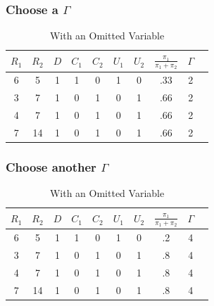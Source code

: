 \documentclass{beamer}
\begin{document}
\begin{frame}[c]\frametitle{Choose a $\Gamma$}
	\begin{table}
		\begin{center}
			\begin{tabular}{cccccccccc}
				$R_1$ & $R_2$ & $D$ & $C_1$ &$C_2$  & $U_1$ & $U_2$ & $\frac{\pi_1}{\pi_1 + \pi_2}$ & $\Gamma$\\ \hline
				6 & 5 & 1 & 1 & 0  & 1 & 0 &  .33 & 2\\
				3 & 7 & 1 & 0 & 1  & 0 & 1 & .66  & 2\\
				4 & 7 & 1 & 0 & 1  & 0 & 1 &  .66 & 2\\
				7 & 14 & 1 & 0 & 1  & 0 & 1 & .66 & 2\\
			\end{tabular}
		\end{center}
		\caption{With an Omitted Variable}
	\end{table}
\end{frame}


\begin{frame}[c]\frametitle{Choose another $\Gamma$}
	\begin{table}
		\begin{center}
			\begin{tabular}{cccccccccc}
				$R_1$ & $R_2$ & $D$ & $C_1$ &$C_2$  & $U_1$ & $U_2$ & $\frac{\pi_1}{\pi_1 + \pi_2}$ & $\Gamma$\\ \hline
				6 & 5 & 1 & 1 & 0  & 1 & 0 &  .2 & 4\\
				3 & 7 & 1 & 0 & 1  & 0 & 1 & .8  & 4\\
				4 & 7 & 1 & 0 & 1  & 0 & 1 &  .8 & 4\\
				7 & 14 & 1 & 0 & 1  & 0 & 1 & .8 & 4\\
			\end{tabular}
		\end{center}
		\caption{With an Omitted Variable}
	\end{table}
\end{frame}
\end{document}

